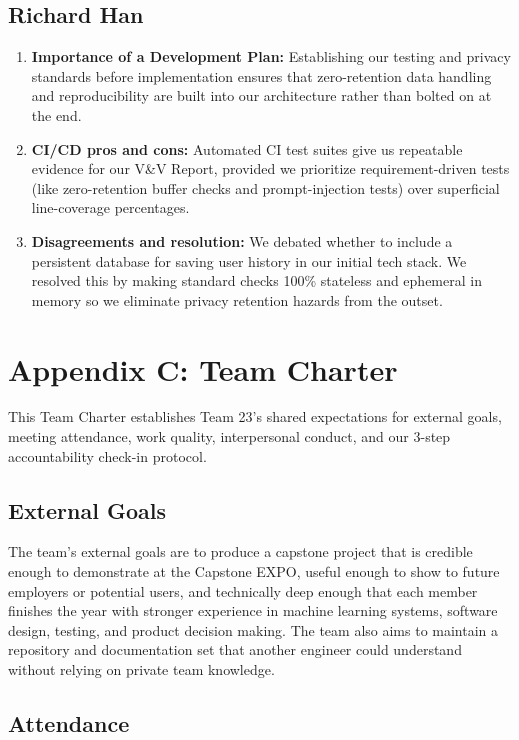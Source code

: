 \documentclass{article}
\begin{document}
\subsection*{Richard Han}
\begin{enumerate}[leftmargin=*]
    \item \textbf{Importance of a Development Plan:} Establishing our testing and privacy standards before implementation ensures that zero-retention data handling and reproducibility are built into our architecture rather than bolted on at the end.
    \item \textbf{CI/CD pros and cons:} Automated CI test suites give us repeatable evidence for our V\&V Report, provided we prioritize requirement-driven tests (like zero-retention buffer checks and prompt-injection tests) over superficial line-coverage percentages.
    \item \textbf{Disagreements and resolution:} We debated whether to include a persistent database for saving user history in our initial tech stack. We resolved this by making standard checks 100\% stateless and ephemeral in memory so we eliminate privacy retention hazards from the outset.
\end{enumerate}

\newpage{}
\section*{Appendix C: Team Charter}

This Team Charter establishes Team 23's shared expectations for external goals, meeting attendance, work quality, interpersonal conduct, and our 3-step accountability check-in protocol.

\subsection*{External Goals}

The team's external goals are to produce a capstone project that is credible enough to demonstrate at the Capstone EXPO, useful enough to show to future employers or potential users, and technically deep enough that each member finishes the year with stronger experience in machine learning systems, software design, testing, and product decision making. The team also aims to maintain a repository and documentation set that another engineer could understand without relying on private team knowledge.

\subsection*{Attendance}
\end{document}
